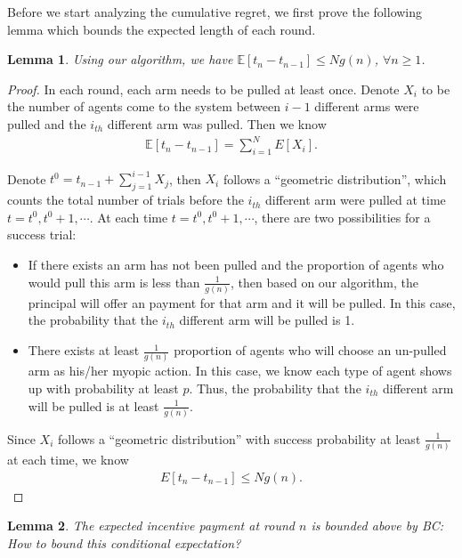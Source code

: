 \documentclass{article}
\newcommand{\bccomment}[1]{{\color{blue}BC: #1}}
\newtheorem{lemma}{Lemma}
\begin{document}
Before we start analyzing the cumulative regret, we first prove the following lemma which bounds the expected length of each round.

\begin{lemma}
Using our algorithm, we have $\mathbb{E}[t_{n}-t_{n-1}]\leq Ng(n)$, $\forall n\geq 1$.
\label{round:length}
\end{lemma}


\begin{proof}
In each round, each arm needs to be pulled at least once. Denote $X_{i}$ to be the number of agents come to the system between $i-1$ different arms were pulled and the $i_{th}$ different arm was pulled. Then we know 
\begin{align}
\mathbb{E}[t_{n}-t_{n-1}]=\sum_{i=1}^{N}E[X_{i}]. \nonumber
\end{align}


Denote $t^{0}=t_{n-1}+\sum_{j=1}^{i-1}X_{j}$, then $X_{i}$ follows a ``geometric distribution'', which counts the total number of trials before the $i_{th}$ different arm were pulled at time $t=t^{0},t^{0}+1,\cdots$. At each time $t=t^{0}, t^{0}+1,\cdots$, there are two possibilities for a success trial:
\begin{itemize}
\item If there exists an arm has not been pulled and the proportion of agents who would pull this arm is less than $\frac{1}{g(n)}$, then based on our algorithm, the principal will offer an payment for that arm and it will be pulled. In this case, the probability that the $i_{th}$ different arm will be pulled is 1.  
\item There exists at least $\frac{1}{g(n)}$ proportion of agents who will choose an un-pulled arm as his/her myopic action. In this case, we know each type of agent shows up with probability at least $p$. Thus, the probability that the $i_{th}$ different arm will be pulled is at least $\frac{1}{g(n)}$.
\end{itemize}

Since $X_{i}$ follows a ``geometric distribution'' with success probability at least $\frac{1}{g(n)}$ at each time, we know 
\begin{align}
E[t_{n}-t_{n-1}]\leq Ng(n). \nonumber
\end{align}
\end{proof}

\begin{lemma}
The expected incentive payment at round $n$ is bounded above by \bccomment{How to bound this conditional expectation?}
\end{lemma}
\end{document}
